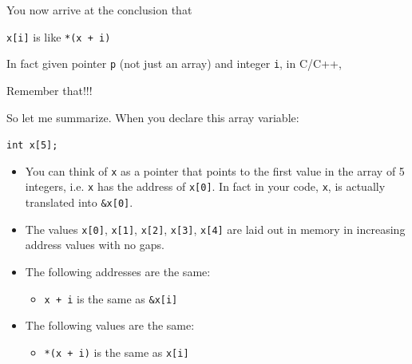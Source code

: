 You now arrive at the conclusion that
\begin{center}
\texttt{x[i]} is like \texttt{*(x + i)}
\end{center}

In fact given  pointer \texttt{p} (not just an array) and integer \texttt{i}, in C/C++,

\texttt{}\texttt{}

Remember that!!!

So let me summarize. When you declare this array variable:

\verb!int x[5];!

\begin{itemize}
\item You can think of \texttt{x} as a pointer that points to the first value
  in the array of 5 integers, i.e. \texttt{x} has the address of
  \texttt{x[0]}. In fact in your code, \texttt{x}, is actually
  translated into \texttt{\&x[0]}.
\item The values \texttt{x[0]}, \texttt{x[1]}, \texttt{x[2]},
  \texttt{x[3]}, \texttt{x[4]} are laid out in memory in increasing
  address values with no gaps.
\item The following addresses are the same:
  \begin{itemize}
  \item \texttt{x + i}          is the same as      \texttt{\&x[i]}
  \end{itemize}
\item The following values are the same:
  \begin{itemize}
  \item \texttt{*(x + i)}       is the same as      \texttt{x[i]}
  \end{itemize}
\end{itemize}













